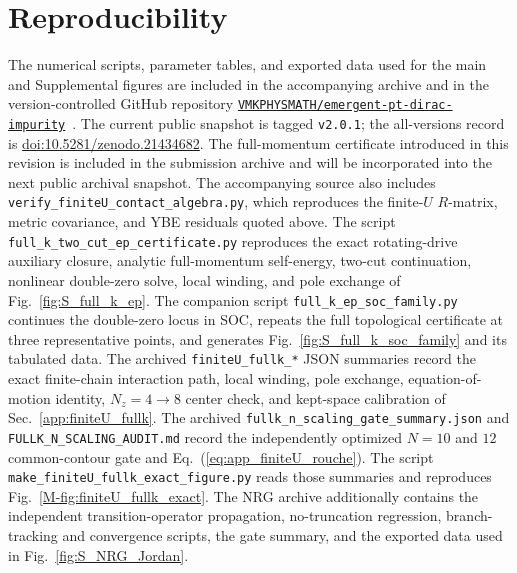 \documentclass[%
  aps,prb,reprint,amsmath,amssymb,superscriptaddress,longbibliography,floatfix
]{revtex4-2}
\begin{document}
\section*{Reproducibility}
The numerical scripts, parameter tables, and exported data used for the main
and Supplemental figures are included in the accompanying archive and in the
version-controlled GitHub repository
\href{https://github.com/VMKPHYSMATH/emergent-pt-dirac-impurity}{\texttt{VMKPHYSMATH/emergent-pt-dirac-impurity}}~\cite{kulkarni2026code}.
The current public snapshot is tagged \texttt{v2.0.1}; the all-versions
record is
\href{https://doi.org/10.5281/zenodo.21434682}{doi:10.5281/zenodo.21434682}.
The full-momentum certificate introduced in this revision is included in the
submission archive and will be incorporated into the next public archival
snapshot.
The accompanying source also includes
\nolinkurl{verify_finiteU_contact_algebra.py}, which reproduces the
finite-\(U\) \(R\)-matrix, metric covariance, and YBE residuals quoted above.
The script \nolinkurl{full_k_two_cut_ep_certificate.py} reproduces the exact
rotating-drive auxiliary closure, analytic full-momentum self-energy,
two-cut continuation, nonlinear double-zero solve, local winding, and pole
exchange of Fig.~\ref{fig:S_full_k_ep}.
The companion script \nolinkurl{full_k_ep_soc_family.py} continues the
double-zero locus in SOC, repeats the full topological certificate at three
representative points, and generates Fig.~\ref{fig:S_full_k_soc_family} and
its tabulated data.
The archived \nolinkurl{finiteU_fullk_*} JSON summaries record the exact
finite-chain interaction path, local winding, pole exchange,
equation-of-motion identity, \(N_z=4\to8\) center check, and kept-space
calibration of Sec.~\ref{app:finiteU_fullk}.
The archived \nolinkurl{fullk_n_scaling_gate_summary.json} and
\nolinkurl{FULLK_N_SCALING_AUDIT.md} record the independently optimized
$N=10$ and $12$ common-contour gate and Eq.~(\ref{eq:app_finiteU_rouche}).
The script \nolinkurl{make_finiteU_fullk_exact_figure.py} reads those summaries
and reproduces Fig.~\ref{M-fig:finiteU_fullk_exact}.
The NRG archive additionally contains the independent transition-operator
propagation, no-truncation regression, branch-tracking and convergence
scripts, the gate summary, and the exported data used in
Fig.~\ref{fig:S_NRG_Jordan}.


\end{document}
